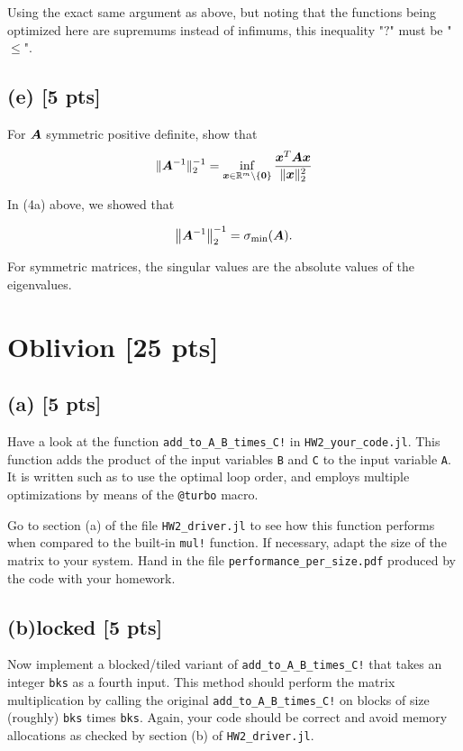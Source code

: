 \documentclass[twoside,10pt]{article}
\begin{document}
Using the exact same argument as above, but noting that the functions being optimized here are supremums instead of infimums, this inequality "$?$" must be "$\leq$".

\subsection*{(e) [5 pts]}
For $\bm{A}$ symmetric positive definite, show that 
\begin{equation*}
  \|\bm{A}^{-1}\|_{2}^{-1} = \inf \limits_{\bm{x} \in \mathbb{R}^m \setminus \{\bm{0}\}} \frac{\bm{x}^T \bm{A} \bm{x}}{\|\bm{x}\|^2_2}
\end{equation*}

In (4a) above, we showed that 

\begin{equation*}
  \left\|\mtx{A}^{-1}\right\|_2^{-1} = \sigma_{\mathrm{min}}\left(\mtx{A}\right).
\end{equation*}

For symmetric matrices, the singular values are the absolute values of the eigenvalues.

\section{Oblivion [25 pts]}
\subsection*{(a) [5 pts]} 
Have a look at the function \texttt{add\_to\_A\_B\_times\_C!} in \texttt{HW2\_your\_code.jl}. 
This function adds the product of the input variables \texttt{B} and \texttt{C} to the input variable \texttt{A}. 
It is written such as to use the optimal loop order, and employs multiple optimizations by means of the \texttt{@turbo} macro.

Go to section (a) of the file \texttt{HW2\_driver.jl} to see how this function performs when compared to the built-in \texttt{mul!} function. 
If necessary, adapt the size of the matrix to your system. 
Hand in the file \texttt{performance\_per\_size.pdf} produced by the code with your homework. 

\subsection*{(b)locked [5 pts]} 
Now implement a blocked/tiled variant of \texttt{add\_to\_A\_B\_times\_C!} that takes an integer \texttt{bks} as a fourth input.
This method should perform the matrix multiplication by calling the original \texttt{add\_to\_A\_B\_times\_C!} on blocks of size (roughly) \texttt{bks} times \texttt{bks}.
Again, your code should be correct and avoid memory allocations as checked by section (b) of \texttt{HW2\_driver.jl}.
\end{document}
